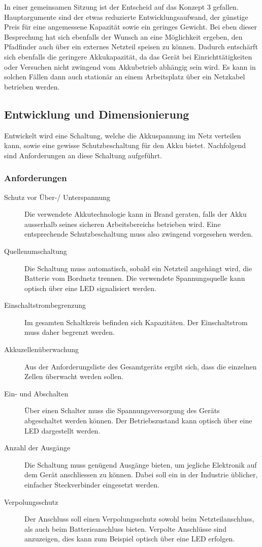 \documentclass[main.tex]{subfiles} %
\begin{document}
In einer gemeinsamen Sitzung ist der Entscheid auf das Konzept 3 gefallen.
Hauptargumente sind der etwas reduzierte Entwicklungsaufwand, der günstige
Preis für eine angemessene Kapazität sowie ein geringes Gewicht. Bei eben
dieser Besprechung hat sich ebenfalls der Wunsch an eine Möglichkeit ergeben,
den Pfadfinder auch über ein externes Netzteil speisen zu können. Dadurch
entschärft sich ebenfalls die geringere Akkukapazität, da das Gerät bei
Einrichttätigkeiten oder Versuchen nicht zwingend vom Akkubetrieb abhängig sein
wird. Es kann in solchen Fällen dann auch stationär an einem Arbeitsplatz über
ein Netzkabel betrieben werden.

\subsection*{Entwicklung und Dimensionierung}

Entwickelt wird eine Schaltung, welche die Akkuspannung im Netz verteilen kann,
sowie eine gewisse Schutzbeschaltung für den Akku bietet. Nachfolgend sind
Anforderungen an diese Schaltung aufgeführt.

\subsubsection*{Anforderungen}
\begin{description}
    \item[Schutz vor Über-/ Unterspannung] Die verwendete Akkutechnologie kann in Brand
          geraten, falls der Akku ausserhalb seines sicheren Arbeitsbereichs betrieben
          wird. Eine entsprechende Schutzbeschaltung muss also zwingend vorgesehen
          werden.
    \item[Quellenumschaltung] Die Schaltung muss automatisch, sobald ein Netzteil
          angehängt wird, die Batterie vom Bordnetz trennen. Die verwendete
          Spannungsquelle kann optisch über eine LED signalisiert werden.
    \item[Einschaltstrombegrenzung] Im gesamten Schaltkreis befinden sich Kapazitäten.
          Der Einschaltstrom muss daher begrenzt werden.
    \item[Akkuzellenüberwachung] Aus der Anforderungsliste des Gesamtgeräts ergibt sich,
          dass die einzelnen Zellen überwacht werden sollen.
    \item[Ein- und Abschalten] Über einen Schalter muss die Spannungsversorgung des
          Geräts abgeschaltet werden können. Der Betriebszustand kann optisch über eine
          LED dargestellt werden.
    \item[Anzahl der Ausgänge] Die Schaltung muss genügend Ausgänge bieten, um jegliche
          Elektronik auf dem Gerät anschliessen zu können. Dabei soll ein in der
          Industrie üblicher, einfacher Steckverbinder eingesetzt werden.
    \item[Verpolungsschutz] Der Anschluss soll einen Verpolungsschutz sowohl beim
          Netzteilanschluss, als auch beim Batterieanschluss bieten. Verpolte Anschlüsse
          sind anzuzeigen, dies kann zum Beispiel optisch über eine LED erfolgen.
\end{description}
\end{document}

